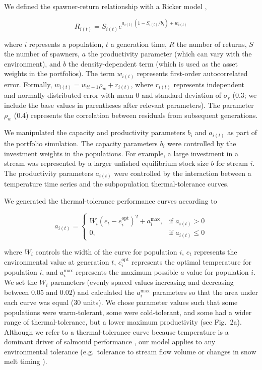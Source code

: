 We defined the spawner-return relationship with a Ricker model \citep{ricker1954},

\[R_{i(t)} = S_{i(t)}e^{a_{i(t)}(1-S_{i(t)}/b_i) + w_{i(t)}}\]

\noindent where $i$ represents a population, $t$ a generation time, $R$ the number of returns, $S$ the number of spawners, $a$ the productivity parameter (which can vary with the environment), and $b$ the density-dependent term (which is used as the asset weights in the portfolios). The term $w_{i(t)}$ represents first-order autocorrelated error. Formally, $w_{i(t)} = w_{ti-1} \rho_w + r_{i(t)}$, where $r_{i(t)}$ represents independent and normally distributed error with mean 0 and standard deviation of $\sigma_r$ (0.3; we include the base values in parentheses after relevant parameters). The parameter $\rho_w$ (0.4) represents the correlation between residuals from subsequent generations.

We manipulated the capacity and productivity parameters $b_i$ and $a_{i(t)}$ as part of the portfolio simulation. The capacity parameters $b_i$ were controlled by the investment weights in the populations. For example, a large investment in a stream was represented by a larger unfished equilibrium stock size $b$ for stream $i$. The productivity parameters $a_{i(t)}$ were controlled by the interaction between a temperature time series and the subpopulation thermal-tolerance curves.

We generated the thermal-tolerance performance curves according to

\[a_{i(t)} =
  \begin{cases}
    W_i (e_t - e_i^{\mathrm{opt}})^2 + a_i^{\mathrm{max}},
      & \text{if } a_{i(t)} > 0\\
      0, & \text{if } a_{i(t)} \leq 0
  \end{cases}\]

\noindent where $W_i$ controls the width of the curve for population $i$, $e_t$ represents the environmental value at generation $t$, $e_i^{\mathrm{opt}}$ represents the optimal temperature for population $i$, and $a_i^{\mathrm{max}}$ represents the maximum possible $a$ value for population $i$. We set the $W_i$ parameters (evenly spaced values increasing and decreasing between 0.05 and 0.02) and calculated the $a_i^{\mathrm{max}}$ parameters so that the area under each curve was equal (30 units). We chose parameter values such that some populations were warm-tolerant, some were cold-tolerant, and some had a wider range of thermal-tolerance, but a lower maximum productivity (see Fig.~2a). Although we refer to a thermal-tolerance curve because temperature is a dominant driver of salmonid performance \citep{mccullough1999}, our model applies to any environmental tolerance (e.g.~tolerance to stream flow volume or changes in snow melt timing \citep{crozier2008}).

